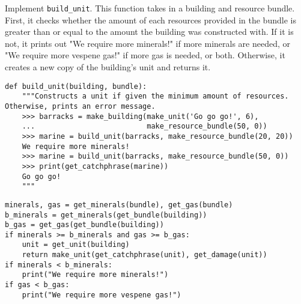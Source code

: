 \question Implement {\tt build\_unit}. This function takes in a building and
resource bundle. First, it checks whether the amount of each resources provided
in the bundle is greater than or equal to the amount the building was
constructed with. If it is not, it prints out "We require more minerals!" if
more minerals are needed, or "We require more vespene gas!" if more gas is
needed, or both.  Otherwise, it creates a new copy of the building's unit and
returns it.

\begin{lstlisting}
def build_unit(building, bundle):
    """Constructs a unit if given the minimum amount of resources. Otherwise, prints an error message.
    >>> barracks = make_building(make_unit('Go go go!', 6),
    ...                          make_resource_bundle(50, 0))
    >>> marine = build_unit(barracks, make_resource_bundle(20, 20))
    We require more minerals!
    >>> marine = build_unit(barracks, make_resource_bundle(50, 0))
    >>> print(get_catchphrase(marine))
    Go go go!
    """
\end{lstlisting}
\begin{solution}[1in]
\begin{lstlisting}
minerals, gas = get_minerals(bundle), get_gas(bundle)
b_minerals = get_minerals(get_bundle(building))
b_gas = get_gas(get_bundle(building))
if minerals >= b_minerals and gas >= b_gas:
    unit = get_unit(building)
    return make_unit(get_catchphrase(unit), get_damage(unit))
if minerals < b_minerals:
    print("We require more minerals!")
if gas < b_gas:
    print("We require more vespene gas!")
\end{lstlisting}
\end{solution}

